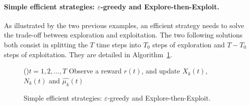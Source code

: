 \paragraph{Simple efficient strategies: $\varepsilon$-greedy and Explore-then-Exploit.}

As illustrated by the two previous examples, an efficient strategy needs to solve the trade-off between exploration and exploitation.
The two following solutions both consist in splitting the $T$ time steps into $T_0$ steps of exploration and $T-T_0$ steps of exploitation.
They are detailed in Algorithm~\ref{algo:2:simpleStrategies}.


\begin{figure}[h!]
	\centering
    \begin{framed}
	\begin{algorithm}[H]
		\For(){$t = 1, 2, \dots, T$}{
            Observe a reward $r(t)$, and update $X_k(t)$, $N_k(t)$ and $\widehat{\mu_k}(t)$
		}
		\caption[Simple efficient strategies: $\varepsilon$-greedy and Explore-then-Exploit.]{Simple efficient strategies: \textcolor{deeppurple}{$\varepsilon$-greedy} and \textcolor{deepgold}{Explore-then-Exploit}.}
		\label{algo:2:simpleStrategies}
	\end{algorithm}
	\end{framed}
\end{figure}


